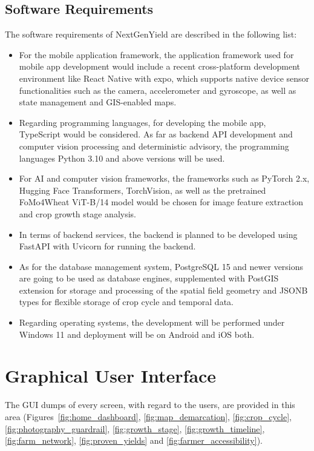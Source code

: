 \documentclass{FastFyp}
\begin{document}
\subsection{Software Requirements}
The software requirements of NextGenYield are described in the following
list:

\begin{itemize}
    \item For the mobile application framework, the application framework used
    for mobile app development would include a recent cross-platform
    development environment like React Native with expo, which supports
    native device sensor functionalities such as the camera, accelerometer and
    gyroscope, as well as state management and GIS-enabled maps.

    \item Regarding programming languages, for developing the mobile app,
    TypeScript would be considered. As far as backend API development
    and computer vision processing and deterministic advisory, the programming
    languages Python 3.10 and above versions will be used.

    \item For AI and computer vision frameworks, the frameworks such as
    PyTorch 2.x, Hugging Face Transformers, TorchVision, as well as the
    pretrained FoMo4Wheat ViT-B/14 model would be chosen for image feature
    extraction and crop growth stage analysis.

    \item In terms of backend services, the backend is planned to be developed
    using FastAPI with Uvicorn for running the backend.

    \item As for the database management system, PostgreSQL 15 and newer
    versions are going to be used as database engines, supplemented with
    PostGIS extension for storage and processing of the spatial field geometry
    and JSONB types for flexible storage of crop cycle and temporal data.

    \item Regarding operating systems, the development will be performed under
    Windows 11 and deployment will be on Android and iOS both.
\end{itemize}
\clearpage
\section{Graphical User Interface}
The GUI dumps of every screen, with regard to the users, are provided in this area (Figures~\ref{fig:home_dashboard}, \ref{fig:map_demarcation}, \ref{fig:crop_cycle}, \ref{fig:photography_guardrail}, \ref{fig:growth_stage}, \ref{fig:growth_timeline}, \ref{fig:farm_network}, \ref{fig:proven_yields} and \ref{fig:farmer_accessibility}).
\end{document}
